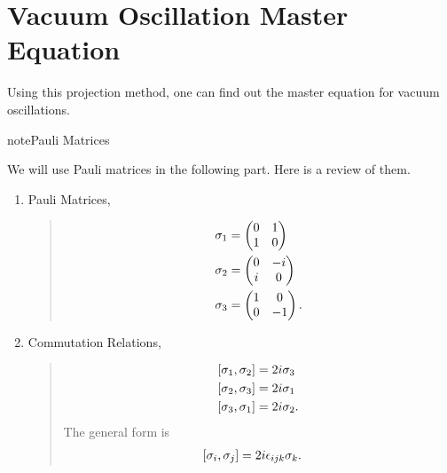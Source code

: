 \documentclass[letterpaper,12pt,english]{sphinxmanual}
\begin{document}
\section{Vacuum Oscillation Master Equation}
\label{mastereqn:vacuum-oscillation-master-equation}
Using this projection method, one can find out the master equation for vacuum oscillations.

\begin{notice}{note}{Pauli Matrices}

We will use Pauli matrices in the following part. Here is a review of them.
\begin{enumerate}
\item {} 
Pauli Matrices,
\begin{quote}
\begin{gather}
\begin{split}\sigma_1 &= \begin{pmatrix} 0 & 1 \\ 1 & 0 \end{pmatrix} \\
\sigma_2 & = \begin{pmatrix} 0 & -i \\ i & 0 \end{pmatrix} \\
\sigma_3 & = \begin{pmatrix} 1 & 0 \\ 0 & -1 \end{pmatrix}.\end{split}\notag
\end{gather}\end{quote}

\end{enumerate}
\begin{enumerate}
\setcounter{enumi}{1}
\item {} 
Commutation Relations,
\begin{quote}
\begin{gather}
\begin{split}[\sigma_1,\sigma_2] &= 2i \sigma_3 \\
[\sigma_2,\sigma_3] &= 2i \sigma_1 \\
[\sigma_3,\sigma_1] &= 2i \sigma_2.\end{split}\notag
\end{gather}
The general form is
\begin{gather}
\begin{split}[\sigma_i,\sigma_j] &= 2i \epsilon_{ijk} \sigma_k.\end{split}\notag
\end{gather}\end{quote}

\end{enumerate}
\end{notice}
\end{document}
